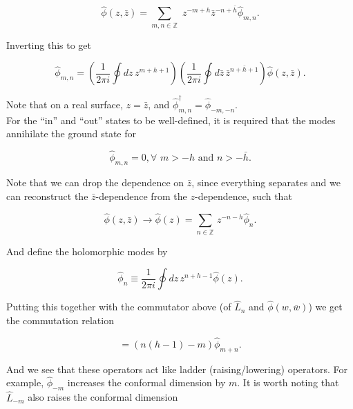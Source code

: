 \begin{equation}
\hat{\phi} (z, \bar{z}) = \sum_{m,n \in \mathbb{Z}} \,\, z^{-m+h}  \bar{z}^{-n+\bar{h}} \hat{\phi}_{m,n}.
\end{equation}

\noindent Inverting this to get

\begin{equation}
\hat{\phi}_{m,n} = \left(\frac{1}{2\pi i} \oint dz \, z^{m+h+1} \right) \left( \frac{1}{2\pi i} \oint d\bar{z} \, \bar{z}^{n+\bar{h}+1} \right) \hat{\phi} (z, \bar{z}).
\end{equation}

\noindent Note that on a real surface, $z=\bar{z}$, and $\hat{\phi}^\dagger_{m,n} = \hat{\phi}_{-m,-n}$. \\

\noindent For the ``in'' and ``out'' states to be well-defined, it is required that the modes annihilate the ground state for

\begin{equation}
\hat{\phi}_{m,n} = 0, \forall \,\, m > -h \text{ and } n >-\bar{h}.
\end{equation}

\noindent Note that we can drop the dependence on $\bar{z}$, since everything separates and we can reconstruct the $\bar{z}$-dependence from the $z$-dependence, such that

\begin{equation}
\hat{\phi} (z,\bar{z}) \rightarrow \hat{\phi} (z) = \sum_{n \in \mathbb{Z}} \, z^{-n-h} \hat{\phi}_n.
\end{equation}

\noindent And define the holomorphic modes by

\begin{equation}
\hat{\phi}_n \equiv \frac{1}{2\pi i} \oint dz \, z^{n+h-1} \hat{\phi} (z).
\end{equation}

\noindent Putting this together with the commutator above (of $\hat{L}_n$ and $\hat{\phi}(w,\bar{w})$) we get the commutation relation

\begin{equation}
[ \hat{L}_n, \hat{\phi}_m ] = (n(h-1)-m) \hat{\phi}_{m+n}.
\end{equation}

\noindent And we see that these operators act like ladder (raising/lowering) operators. For example, $\hat{\phi}_{-m}$ increases the conformal dimension by $m$. It is worth noting that $\hat{L}_{-m}$ also raises the conformal dimension

